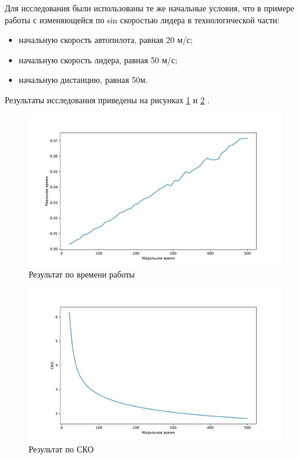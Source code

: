 \documentclass[12pt]{report}
\begin{document}
Для исследования были использованы те же начальные условия, что в примере работы с изменяющейся по sin скоростью лидера в технологической части: 
\begin{itemize}
    \item начальную скорость автопилота, равная 20 м/с;
    \item начальную скорость лидера, равная 50 м/с;
    \item начальную дистанцию, равная 50м.
\end{itemize}

Результаты исследования приведены на рисунках \ref{fig:res_time} и \ref{fig:res_std} .

\newpage
\begin{figure}[h!]
  \centering
  \includegraphics[scale = 0.5]{result_time.pdf}
  \caption{Результат по времени работы}
  \label{fig:res_time}
\end{figure}

\begin{figure}[h!]
  \centering
  \includegraphics[scale = 0.5]{result_std.pdf}
  \caption{Результат по СКО}
  \label{fig:res_std}
\end{figure}
\end{document}
